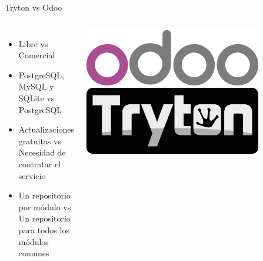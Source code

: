     \begin{frame}{Tryton vs Odoo}
        \fontsize{10}{11}\selectfont
        \begin{columns}
            \begin{itemize}
                \item Libre vs Comercial
                \item PostgreSQL, MySQL y SQLite vs PostgreSQL
                \item Actualizaciones gratuitas vs Necesidad de contratar el servicio
                \item Un repositorio por módulo vs Un repositorio para todos los módulos comunes
            \end{itemize}
            \begin{center}
            \includegraphics[width=0.8\textwidth]{./Images/Logos/logo-odoo.png}
	 \includegraphics[width=0.8\textwidth]{./Images/Logos/tryton-name.jpg}
            \end{center}
        \end{columns}
	\end{frame}
